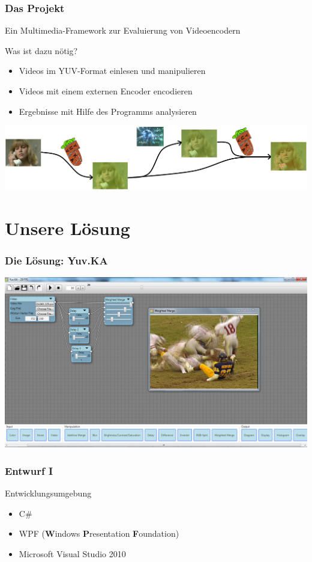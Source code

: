 \documentclass[t]{beamer}
\begin{document}
\begin{frame}
	\frametitle{Das Projekt}
	\begin{center}
		Ein Multimedia-Framework zur Evaluierung von Videoencodern	
	\end{center}
	 Was ist dazu nötig? \newline
	\begin{itemize}
		\item<1-> Videos im YUV-Format einlesen und manipulieren
		\item<1-> Videos mit einem externen Encoder encodieren
		\item<1-> Ergebnisse mit Hilfe des Programms analysieren
	\end{itemize}
	\includegraphics[scale=.34]{YuvKA-Workchart.png}
\end{frame}

\section{Unsere Lösung}
\begin{frame}
	\frametitle{Die Lösung: Yuv.KA}
	\begin{center}
		\includegraphics[height=.9\textheight]{startup_screenshot.png}
	\end{center}
\end{frame}

\begin{frame}
	\frametitle{Entwurf I}
	
	Entwicklungsumgebung ~\\
	\begin{itemize}
		\item<+-> C\#
		\item<+-> WPF (\textbf{W}indows \textbf{P}resentation \textbf{F}oundation)
		\item<+-> Microsoft Visual Studio 2010
	\end{itemize}
\end{frame}
\end{document}
